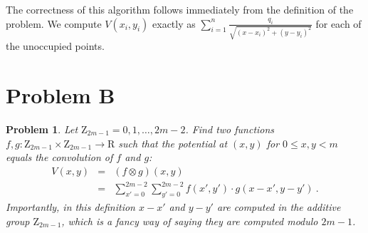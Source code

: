 \documentclass[psamsfonts]{amsart}
\newtheorem{prob}{Problem}[section]
\newenvironment{sol}{{\bfseries Solution}}{\qedsymbol}
\theoremstyle{definition}
\theoremstyle{remark}
\numberwithin{equation}{section}
\begin{document}
\begin{sol}
The correctness of this algorithm follows immediately from the definition of the problem. We compute $V(x_i, y_i)$ exactly as $\sum_{i=1}^n \frac{q_i}{\sqrt{(x - x_i)^2 + (y - y_i)^2}}$ for each of the unoccupied points. 
\end{sol}

\section{Problem B}

\begin{prob}
Let $\mathrm{Z}_{2m-1}={0,1,\ldots,2m-2}$.  Find two functions
$f,g:\mathrm{Z}_{2m-1}\times \mathrm{Z}_{2m-1} \to \mathrm{R}$ such that the
potential at $(x,y)$ for $0 \leq x,y < m$ equals the convolution of $f$ and $g$:
\begin{eqnarray*}
V(x,y) & = & (f\otimes g)(x,y) \\
& = & \sum_{x'=0}^{2m-2}\sum_{y'=0}^{2m-2} f(x',y')\cdot
g(x-x',y-y')\ .
\end{eqnarray*}
Importantly, in this definition $x-x'$ and $y-y'$ are computed in the
additive group $\mathrm{Z}_{2m-1}$, which is a fancy way of saying
they are computed modulo $2m-1$.
\end{prob}
\end{document}

